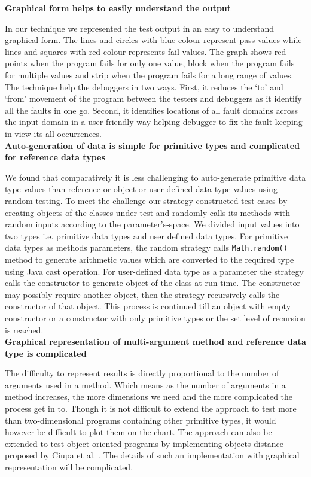 \textbf{Graphical form helps to easily understand the output}

In our technique we represented the test output in an easy to understand graphical form. The lines and circles with blue colour represent pass values while lines and squares with red colour represents fail values. The graph shows red points when the program fails for only one value, block when the program fails for multiple values and strip when the program fails for a long range of values.  The technique help the debuggers in two ways. First, it reduces the `to' and `from' movement of the program between the testers and debuggers as it identify all the faults in one go. Second, it identifies locations of all fault domains across the input domain in a user-friendly way helping debugger to fix the fault keeping in view its all occurrences.\\

\textbf{Auto-generation of data is simple for primitive types and complicated for reference data types}

We found that comparatively it is less challenging to auto-generate primitive data type values than reference or object or user defined data type values using random testing. To meet the challenge our strategy constructed test cases by creating objects of the classes under test and randomly calls its methods with random inputs according to the parameter's-space. We divided input values into two types i.e. primitive data types and user defined data types. For primitive data types as methods parameters, the random strategy calls \verb+Math.random()+ method to generate arithmetic values which are converted to the required type using Java cast operation. For user-defined data type as a parameter the strategy calls the constructor to generate object of the class at run time. The constructor may possibly require another object, then the strategy recursively calls the constructor of that object. This process is continued till an object with empty constructor or a constructor with only primitive types or the set level of recursion is reached.\\


\textbf{Graphical representation of multi-argument method and reference data type is complicated}

The difficulty to represent results is directly proportional to the number of arguments used in a method. Which means as the number of arguments in a method increases, the more dimensions we need and the more complicated the process get in to. Though it is not difficult to extend the approach to test more than two-dimensional programs containing other primitive types, it would however be difficult to plot them on the chart. The approach can also be extended to test object-oriented programs by implementing objects distance proposed by Ciupa et al. \cite{ciupa2006object}. The details of such an implementation with graphical representation will be complicated.\\



